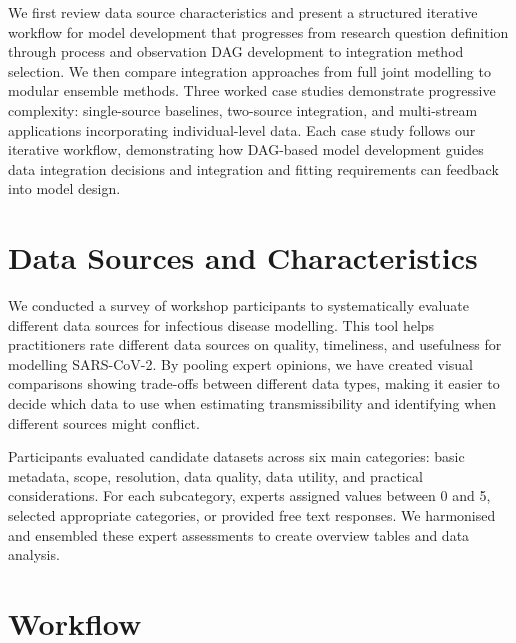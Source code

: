 \documentclass{article}
\begin{document}
We first review data source characteristics and present a structured iterative workflow for model development that progresses from research question definition through process and observation DAG development to integration method selection.
We then compare integration approaches from full joint modelling to modular ensemble methods.
Three worked case studies demonstrate progressive complexity: single-source baselines, two-source integration, and multi-stream applications incorporating individual-level data.
Each case study follows our iterative workflow, demonstrating how DAG-based model development guides data integration decisions and integration and fitting requirements can feedback into model design.

\section{Data Sources and Characteristics}

We conducted a survey of workshop participants to systematically evaluate different data sources for infectious disease modelling.
This tool helps practitioners rate different data sources on quality, timeliness, and usefulness for modelling SARS-CoV-2.
By pooling expert opinions, we have created visual comparisons showing trade-offs between different data types, making it easier to decide which data to use when estimating transmissibility and identifying when different sources might conflict.

Participants evaluated candidate datasets across six main categories: basic metadata, scope, resolution, data quality, data utility, and practical considerations.
For each subcategory, experts assigned values between 0 and 5, selected appropriate categories, or provided free text responses.
We harmonised and ensembled these expert assessments to create overview tables and data analysis.


\section{Workflow}
\end{document}
